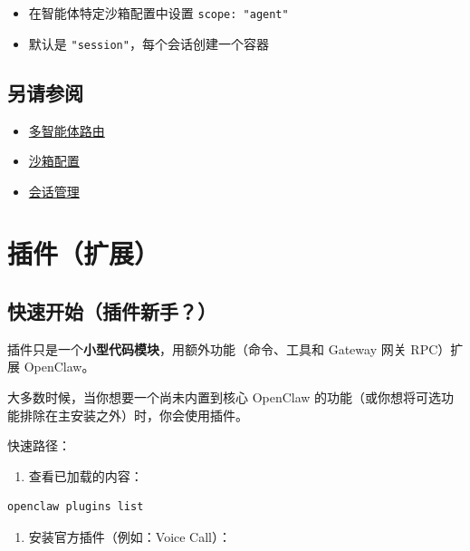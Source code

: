\begin{itemize}
  \item 在智能体特定沙箱配置中设置 \texttt{scope: "agent"}
  \item 默认是 \texttt{"session"}，每个会话创建一个容器
\end{itemize}


\hrulefill


\subsection{另请参阅}


\begin{itemize}
  \item \href{/concepts/multi-agent}{多智能体路由}
  \item \href{/gateway/configuration\#agentsdefaults-sandbox}{沙箱配置}
  \item \href{/concepts/session}{会话管理}
\end{itemize}



\clearpage

\section{插件（扩展）}


\subsection{快速开始（插件新手？）}


插件只是一个\textbf{小型代码模块}，用额外功能（命令、工具和 Gateway 网关 RPC）扩展 OpenClaw。

大多数时候，当你想要一个尚未内置到核心 OpenClaw 的功能（或你想将可选功能排除在主安装之外）时，你会使用插件。

快速路径：

\begin{enumerate}
  \item 查看已加载的内容：
\end{enumerate}


\begin{lstlisting}[language=bash]
openclaw plugins list
\end{lstlisting}


\begin{enumerate}
  \item 安装官方插件（例如：Voice Call）：
\end{enumerate}


